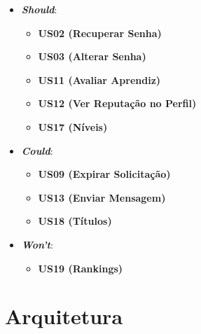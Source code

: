 \begin{itemize}

\item \textbf{\textit{Should}}:

\begin{itemize}

\item \textbf{US02 (Recuperar Senha)}

\item \textbf{US03 (Alterar Senha)}

\item \textbf{US11 (Avaliar Aprendiz)}

\item \textbf{US12 (Ver Reputação no Perfil)}

\item \textbf{US17 (Níveis)}

\end{itemize}

\end{itemize}

\begin{itemize}

\item \textbf{\textit{Could}}:

\begin{itemize}

\item \textbf{US09 (Expirar Solicitação)}

\item \textbf{US13 (Enviar Mensagem)}

\item \textbf{US18 (Títulos)}

\end{itemize}

\end{itemize}

\begin{itemize}

\item \textbf{\textit{Won't}}:

\begin{itemize}

\item \textbf{US19 (Rankings)}

\end{itemize}

\end{itemize}


\section [Arquitetura] {Arquitetura}
\label{arquitetura}

